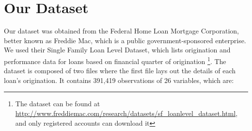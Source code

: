 \documentclass[12 pt]{uncw_thesis}
\theoremstyle{plain}
\theoremstyle{remark}
\theoremstyle{definition}
\begin{document}
\section{Our Dataset}
Our dataset was obtained from the Federal Home Loan Mortgage Corporation, better known as Freddie Mac, which is a public government-sponsored enterprise. We used their Single Family Loan Level Dataset, which lists origination and performance data for loans based on financial quarter of origination \footnote{The dataset can be found at \href{ http://www.freddiemac.com/research/datasets/sf\_loanlevel\_dataset.html}{http://www.freddiemac.com/research/datasets/sf\_loanlevel\_dataset.html}, and only registered accounts can download it}. The dataset is composed of two files where the first file lays out the details of each loan's origination. It contains 391,419 observations of 26 variables, which are: 
\end{document}
